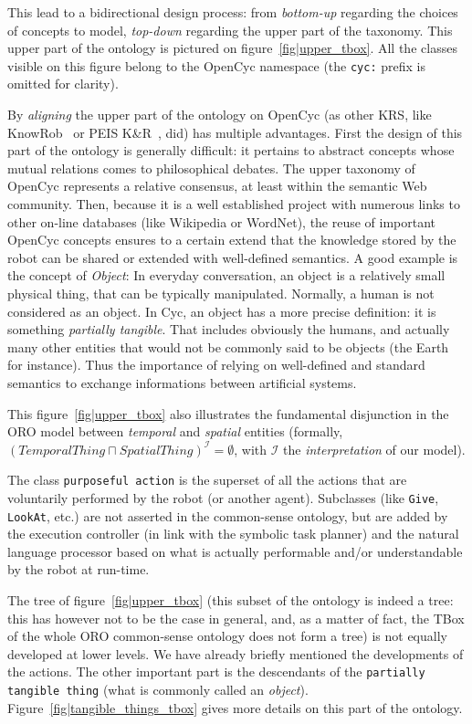\documentclass[preprint,5p]{elsarticle}
\newcommand{\concept}[1]{{\small \texttt{#1}}}
\begin{document}
This lead to a bidirectional design process: from \emph{bottom-up} regarding
the choices of concepts to model, \emph{top-down} regarding the upper part of the
taxonomy. This upper part of the ontology is pictured on
figure~\ref{fig|upper_tbox}. All the classes visible on this figure belong to the
{\sc OpenCyc} namespace (the {\tt cyc:} prefix is omitted for clarity).

By \emph{aligning} the upper part of the ontology on {\sc OpenCyc} (as other
KRS, like {\sc KnowRob}~\cite{Tenorth2009a} or PEIS K\&R~\cite{Daoutis2009}, did)
has multiple advantages. First the design of this part of the ontology is
generally difficult: it pertains to abstract concepts whose mutual relations
comes to philosophical debates. The upper taxonomy of {\sc OpenCyc} represents
a relative consensus, at least within the semantic Web community. Then, because
it is a well established project with numerous links to other on-line databases
(like Wikipedia or WordNet), the reuse of important {\sc OpenCyc} concepts
ensures to a certain extend that the knowledge stored by the robot can be
shared or extended with well-defined semantics. A good example is the concept
of \emph{Object}: In everyday conversation, an object is a relatively small
physical thing, that can be typically manipulated. Normally, a human is not
considered as an object. In {\sc Cyc}, an object has a more precise definition:
it is something \emph{partially tangible}. That includes obviously the humans,
and actually many other entities that would not be commonly said to be objects
(the Earth for instance). Thus the importance of relying on well-defined and
standard semantics to exchange informations between artificial systems.

This figure~\ref{fig|upper_tbox} also illustrates the fundamental disjunction
in the ORO model between \emph{temporal} and \emph{spatial} entities (formally,
$(TemporalThing \sqcap SpatialThing)^{\mathcal{I}} = \emptyset$, with
$\mathcal{I}$ the \emph{interpretation} of our model).

The class \concept{purposeful action} is the superset of all the actions that
are voluntarily performed by the robot (or another agent). Subclasses (like
\concept{Give}, \concept{LookAt}, etc.) are not asserted in the common-sense
ontology, but are added by the execution controller (in link with the symbolic
task planner) and the natural language processor based on what is actually
performable and/or understandable by the robot at run-time.

The tree of figure~\ref{fig|upper_tbox} (this subset of the ontology is indeed
a tree: this has however not to be the case in general, and, as a matter of
fact, the TBox of the whole ORO common-sense ontology does not form a tree) is
not equally developed at lower levels. We have already briefly mentioned the
developments of the actions. The other important part is the descendants of the
\concept{partially tangible thing} (what is commonly called an \emph{object}).
Figure~\ref{fig|tangible_things_tbox} gives more details on this part of the
ontology.
\end{document}
